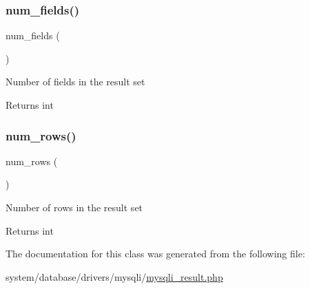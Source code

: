 \subsubsection{\texorpdfstring{num\+\_\+fields()}{num\_fields()}}
{\footnotesize\ttfamily num\+\_\+fields (\begin{DoxyParamCaption}{ }\end{DoxyParamCaption})}

Number of fields in the result set

\begin{DoxyReturn}{Returns}
int 
\end{DoxyReturn}
\mbox{\label{class_c_i___d_b__mysqli__result_a218657c303ee499b97710ab0cd2f5d6e}} 
\subsubsection{\texorpdfstring{num\+\_\+rows()}{num\_rows()}}
{\footnotesize\ttfamily num\+\_\+rows (\begin{DoxyParamCaption}{ }\end{DoxyParamCaption})}

Number of rows in the result set

\begin{DoxyReturn}{Returns}
int 
\end{DoxyReturn}


The documentation for this class was generated from the following file\+:\begin{DoxyCompactItemize}
\item 
system/database/drivers/mysqli/\mbox{\hyperlink{mysqli__result_8php}{mysqli\+\_\+result.\+php}}\end{DoxyCompactItemize}
